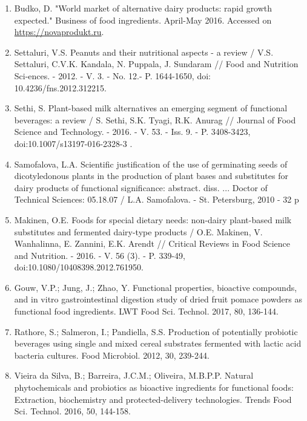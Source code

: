 \begin{enumerate}
\item
Budko, D. "World market of alternative dairy products: rapid growth expected." Business of food ingredients. April-May 2016. Accessed on \href{https://novaprodukt.ru/ing/articles/non\_dairy\_milk/}{https://novaprodukt.ru}.

\item
Settaluri, V.S. Peanuts and their nutritional aspects - a review /
V.S. Settaluri, C.V.K. Kandala, N. Puppala, J. Sundaram // Food and
Nutrition Sci-ences. - 2012. - V. 3. - No. 12.- P. 1644-1650, doi:
10.4236/fns.2012.312215.

\item
Sethi, S. Plant-based milk alternatives an emerging segment of
functional beverages: a review / S. Sethi, S.K. Tyagi, R.K. Anurag //
Journal of Food Science and Technology. - 2016. - V. 53. - Iss. 9. -
P. 3408-3423, doi:10.1007/s13197-016-2328-3 .

\item
Samofalova, L.A. Scientific justification of the use of germinating
seeds of dicotyledonous plants in the production of plant bases and
substitutes for dairy products of functional significance: abstract.
diss. ... Doctor of Technical Sciences: 05.18.07 / L.A. Samofalova. -
St. Petersburg, 2010 - 32 p

\item
Makinen, O.E. Foods for special dietary needs: non-dairy plant-based
milk substitutes and fermented dairy-type products / O.E. Makinen, V.
Wanhalinna, E. Zannini, E.K. Arendt // Critical Reviews in Food Science
and Nutrition. - 2016. - V. 56 (3). - P. 339-49,
doi:10.1080/10408398.2012.761950.

\item
Gouw, V.P.; Jung, J.; Zhao, Y. Functional properties, bioactive
compounds, and in vitro gastrointestinal digestion study of dried fruit
pomace powders as functional food ingredients. LWT Food Sci. Technol.
2017, 80, 136-144.

\item
Rathore, S.; Salmeron, I.; Pandiella, S.S. Production of potentially
probiotic beverages using single and mixed cereal substrates fermented
with lactic acid bacteria cultures. Food Microbiol. 2012, 30, 239-244.

\item
Vieira da Silva, B.; Barreira, J.C.M.; Oliveira, M.B.P.P. Natural
phytochemicals and probiotics as bioactive ingredients for functional
foods: Extraction, biochemistry and protected-delivery technologies.
Trends Food Sci. Technol. 2016, 50, 144-158.


\end{enumerate}
